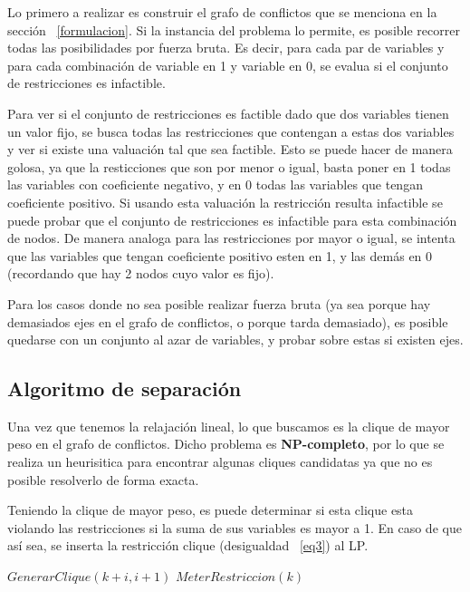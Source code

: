 Lo primero a realizar es construir el grafo de conflictos que se menciona en la secci\'on ~\ref{formulacion}.
Si la instancia del problema lo permite, es posible recorrer todas las posibilidades por fuerza bruta. Es decir, para cada par de variables y para cada 
combinaci\'on de variable en 1 y variable en 0, se evalua si el conjunto de restricciones es infactible.

Para ver si el conjunto de restricciones es factible dado que dos variables tienen un valor fijo, se busca
todas las restricciones que contengan a estas dos variables y ver si existe una valuaci\'on tal que sea factible. Esto se puede hacer de manera
golosa, ya que la resticciones que son por menor o igual, basta poner en 1 todas las variables con coeficiente negativo, y en 0 todas las variables que tengan coeficiente positivo. Si usando
esta valuaci\'on la restricci\'on resulta infactible se puede probar que el conjunto de restricciones es infactible para esta combinaci\'on de nodos. De manera analoga para las restricciones
 por mayor o igual, se intenta que las variables que tengan coeficiente positivo esten en 1, y las dem\'as en 0 (recordando que hay 2 nodos cuyo valor es fijo).

Para los casos donde no sea posible realizar fuerza bruta (ya sea porque hay demasiados ejes en el grafo de conflictos, o porque tarda demasiado),
es posible quedarse  con un conjunto al azar de variables, y probar sobre estas si existen ejes.

\bigskip
\subsection{Algoritmo de separaci\'on}

Una vez que tenemos la relajaci\'on lineal, lo que buscamos es la clique de mayor peso en el grafo de conflictos. Dicho problema es {\bf NP-completo},
por lo que se realiza un heurisitica para encontrar algunas cliques candidatas ya que no es posible resolverlo de forma exacta. 

Teniendo la clique de mayor peso, es puede determinar si esta clique esta violando las restricciones si la suma de sus variables es mayor a 1. En caso 
de que as\'i sea, se inserta la restricci\'on clique (desigualdad ~\ref{eq3}) al LP.

\newpage 

\begin{algorithmic}
\label{algo3}
 
     \State $GenerarClique(k+i,i+1)$ 
    \EndIf
  \EndFor
     $MeterRestriccion(k)$
     \EndIf
  \EndIf
\EndFunction
\end{algorithmic}
\bigskip

